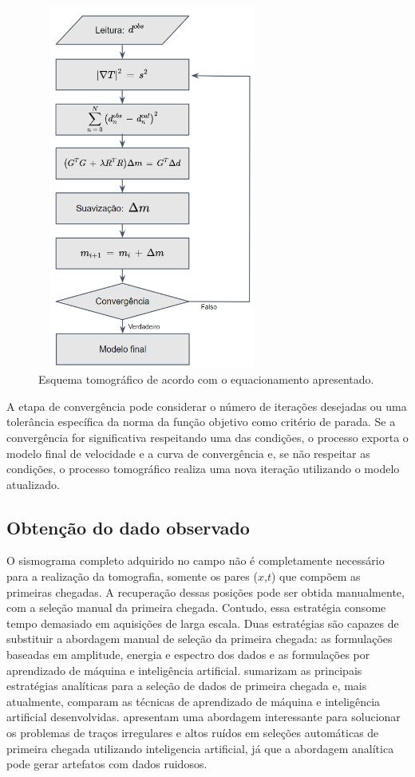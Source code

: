 \begin{figure}[H]
	\centering
	\includegraphics[width=7.5cm, height=12cm]{Imgs/RevisaoBibliografica/tomography_chart.png}
	\caption{Esquema tomográfico de acordo com o equacionamento apresentado.}
	\label{tomography_chart}
\end{figure}

A etapa de convergência pode considerar o número de iterações desejadas ou uma tolerância específica da norma da função objetivo como critério de parada. Se a convergência for significativa respeitando uma das condições, o processo exporta o modelo final de velocidade e a curva de convergência e, se não respeitar as condições, o processo tomográfico realiza uma nova iteração utilizando o modelo atualizado. 

\subsection{Obtenção do dado observado}

O sismograma completo adquirido no campo não é completamente necessário para a realização da tomografia, somente os pares ($x$,$t$) que compõem as primeiras chegadas. A recuperação dessas posições pode ser obtida manualmente, com a seleção manual da primeira chegada. Contudo, essa estratégia consome tempo demasiado em aquisições de larga escala. Duas estratégias são capazes de substituir a abordagem manual de seleção da primeira chegada: as formulações baseadas em amplitude, energia e espectro dos dados e as formulações por aprendizado de máquina e inteligência artificial.  sumarizam as principais estratégias analíticas para a seleção de dados de primeira chegada e, mais atualmente,  comparam as técnicas de aprendizado de máquina e inteligência artificial desenvolvidas.  apresentam uma abordagem interessante para solucionar os problemas de traços irregulares e altos ruídos em seleções automáticas de primeira chegada utilizando inteligencia artificial, já que a abordagem analítica pode gerar artefatos com dados ruidosos. 

